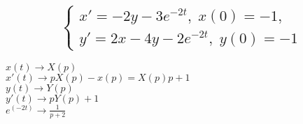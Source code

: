 \documentclass{article}
\begin{document}
    \subsection{
    \begin{equation*}
    \begin{cases}
        x' = -2y -3e^{-2t}, \; x(0) = -1,\\
        y' = 2x - 4y - 2e^{-2t}, \; y(0) = -1        
    \end{cases}
    \end{equation*}
    }
    $x(t)\rightarrow X(p)$ \\
    $x'(t)\rightarrow pX(p) - x(p) = X(p)p +1$ \\
    $y(t) \rightarrow Y(p)$ \\
    $y'(t) \rightarrow pY(p) +1 $\\
    $e{^{(-2t)}} \rightarrow \frac{1}{p+2}$\\
    
\end{document}
